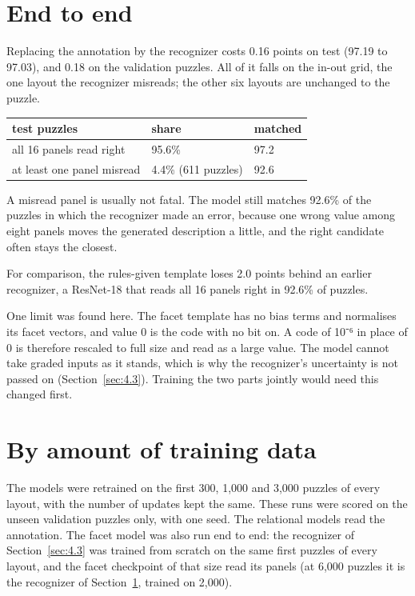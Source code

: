 \section{End to end}\label{sec:5.3}

Replacing the annotation by the recognizer costs 0.16 points on test (97.19 to 97.03), and 0.18 on the validation puzzles. All of it falls on the in-out grid, the one layout the recognizer misreads; the other six layouts are unchanged to the puzzle.

\begin{center}\small
\begin{tabular}{@{}lll@{}}
\toprule
test puzzles & share & matched \\
\midrule
all 16 panels read right & 95.6\% & 97.2 \\
at least one panel misread & 4.4\% (611 puzzles) & 92.6 \\
\bottomrule
\end{tabular}
\end{center}

A misread panel is usually not fatal. The model still matches 92.6\% of the puzzles in which the recognizer made an error, because one wrong value among eight panels moves the generated description a little, and the right candidate often stays the closest.

For comparison, the rules-given template loses 2.0 points behind an earlier recognizer, a ResNet-18 that reads all 16 panels right in 92.6\% of puzzles.

One limit was found here. The facet template has no bias terms and normalises its facet vectors, and value 0 is the code with no bit on. A code of 10⁻⁶ in place of 0 is therefore rescaled to full size and read as a large value. The model cannot take graded inputs as it stands, which is why the recognizer's uncertainty is not passed on (Section~\ref{sec:4.3}). Training the two parts jointly would need this changed first.

\section{By amount of training data}\label{sec:5.4}

The models were retrained on the first 300, 1,000 and 3,000 puzzles of every layout, with the number of updates kept the same. These runs were scored on the unseen validation puzzles only, with one seed. The relational models read the annotation. The facet model was also run end to end: the recognizer of Section~\ref{sec:4.3} was trained from scratch on the same first puzzles of every layout, and the facet checkpoint of that size read its panels (at 6,000 puzzles it is the recognizer of Section~\ref{sec:5.3}, trained on 2,000).

